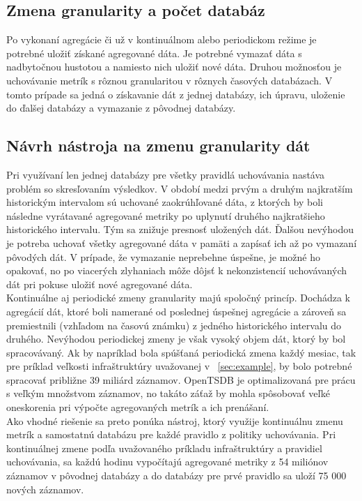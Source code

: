 \documentclass[printed,11pt,twoside,color,cover,table]{fithesis3}
\begin{document}
\subsection{Zmena granularity a počet databáz}
Po vykonaní agregácie či už v kontinuálnom alebo periodickom režime je potrebné uložiť získané agregované dáta. Je potrebné vymazať dáta s nadbytočnou hustotou a namiesto nich uložiť nové dáta.
Druhou možnosťou je uchovávanie metrík s rôznou granularitou v rôznych časových databázach. V tomto prípade sa jedná o získavanie dát z jednej databázy, ich úpravu, uloženie do ďalšej databázy a vymazanie 
z pôvodnej databázy.

\subsection{Návrh nástroja na zmenu granularity dát}
Pri využívaní len jednej databázy pre všetky pravidlá uchovávania nastáva problém so skresľovaním výsledkov. V období medzi prvým a druhým najkratším historickým intervalom sú uchované zaokrúhľované dáta,
z ktorých by boli následne vyrátavané agregované metriky po uplynutí druhého najkratšieho historického intervalu. Tým sa znižuje presnosť uložených dát. Ďalšou nevýhodou je potreba uchovať všetky agregované 
dáta v pamäti a zapísať ich až po vymazaní pôvodých dát. V prípade, že vymazanie neprebehne úspešne, je možné ho opakovať, no po viacerých zlyhaniach môže dôjsť k nekonzistencií uchovávaných dát pri pokuse uložiť 
nové agregované dáta.
\\Kontinuálne aj periodické zmeny granularity majú spoločný princíp. Dochádza k agregácií dát, ktoré boli namerané od poslednej úspešnej agregácie a zároveň sa premiestnili (vzhľadom na časovú známku) z jedného
historického intervalu do druhého. Nevýhodou periodickej zmeny je však vysoký objem dát, ktorý by bol spracovávaný. Ak by napríklad bola spúšťaná periodická zmena každý mesiac, tak pre príklad veľkosti 
infraštruktúry uvažovanej v ~\ref{sec:example}, by bolo potrebné spracovať približne 39 miliárd záznamov. OpenTSDB je optimalizovaná pre prácu s veľkým množstvom záznamov, no takáto záťaž by mohla spôsobovať 
veľké oneskorenia pri výpočte agregovaných metrík a ich prenášaní.
\\Ako vhodné riešenie sa preto ponúka nástroj, ktorý využije kontinuálnu zmenu metrík a samostatnú databázu pre každé pravidlo z politiky uchovávania. Pri kontinuálnej zmene podľa uvažovaného príkladu 
infraštruktúry a pravidiel uchovávania, sa každú hodinu vypočítajú agregované metriky z 54 miliónov záznamov v pôvodnej databázy a do databázy pre prvé pravidlo sa uloží 75 000 nových záznamov. 
\end{document}
